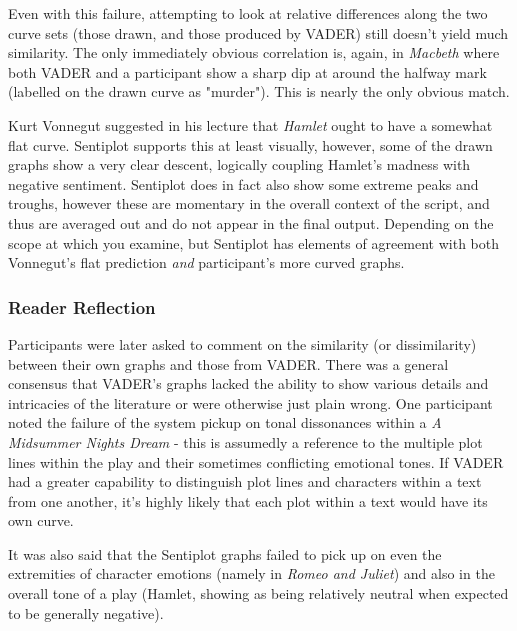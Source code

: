 \documentclass{article}
\begin{document}
            Even with this failure, attempting to look at relative differences along the two curve sets (those drawn, and those produced by VADER) still doesn't yield much similarity. The only immediately obvious correlation is, again, in \textit{Macbeth} where both VADER and a participant show a sharp dip at around the halfway mark (labelled on the drawn curve as "murder"). This is nearly the only obvious match.
            
            Kurt Vonnegut suggested in his lecture that \textit{Hamlet} ought to have a somewhat flat curve. Sentiplot supports this at least visually, however, some of the drawn graphs show a very clear descent, logically coupling Hamlet's madness with negative sentiment. Sentiplot does in fact also show some extreme peaks and troughs, however these are momentary in the overall context of the script, and thus are averaged out and do not appear in the final output. Depending on the scope at which you examine, but Sentiplot has elements of agreement with both Vonnegut's flat prediction \textit{and} participant's more curved graphs.
			\subsubsection{Reader Reflection}
                Participants were later asked to comment on the similarity (or dissimilarity) between their own graphs and those from VADER. There was a general consensus that VADER's graphs lacked the ability to show various details and intricacies of the literature or were otherwise just plain wrong. 
                One participant noted the failure of the system pickup on tonal dissonances within a \textit{A Midsummer Nights Dream} - this is assumedly a reference to the multiple plot lines within the play and their sometimes conflicting emotional tones. If VADER had a greater capability to distinguish plot lines and characters within a text from one another, it's highly likely that each plot within a text would have its own curve.
                
                It was also said that the Sentiplot graphs failed to pick up on even the extremities of character emotions (namely in \textit{Romeo and Juliet}) and also in the overall tone of a play (Hamlet, showing as being relatively neutral when expected to be generally negative).
\end{document}
